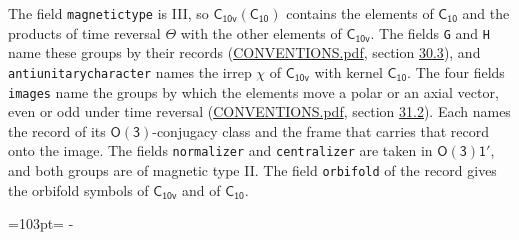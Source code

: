 \documentclass[10pt,a4paper]{article}
\newcommand{\needspace}[1]{\par\penalty-100\begingroup\dimen0=#1\relax\dimen2=\pagegoal
  \advance\dimen2-\pagetotal\ifdim\dimen0>\dimen2\relax\ifdim\dimen2>0pt\vfil\break\fi\fi
  \endgroup}
\numberwithin{equation}{section}
\newcommand{\grp}[1]{\mathsf{#1}}
\begin{document}
The field \texttt{magnetictype} is III, so $\grp{C_{10v}}(\grp{C_{10}})$ contains the elements of $\grp{C_{10}}$ and the products of time reversal $\varTheta$ with the other elements of $\grp{C_{10v}}$. The fields \texttt{G} and \texttt{H} name these groups by their records (\href{../../CONVENTIONS.pdf}{CONVENTIONS.pdf}, section \href{../../CONVENTIONS.pdf\#conv.30.3}{30.3}), and \texttt{antiunitarycharacter} names the irrep $\chi$ of $\grp{C_{10v}}$ with kernel $\grp{C_{10}}$. The four fields \texttt{images} name the groups by which the elements move a polar or an axial vector, even or odd under time reversal (\href{../../CONVENTIONS.pdf}{CONVENTIONS.pdf}, section \href{../../CONVENTIONS.pdf\#conv.31.2}{31.2}). Each names the record of its $\grp{O(3)}$-conjugacy class and the frame that carries that record onto the image. The fields \texttt{normalizer} and \texttt{centralizer} are taken in $\grp{O(3)1'}$, and both groups are of magnetic type II. The field \texttt{orbifold} of the record gives the orbifold symbols of $\grp{C_{10v}}$ and of $\grp{C_{10}}$.
\needspace{103pt}
\end{document}
